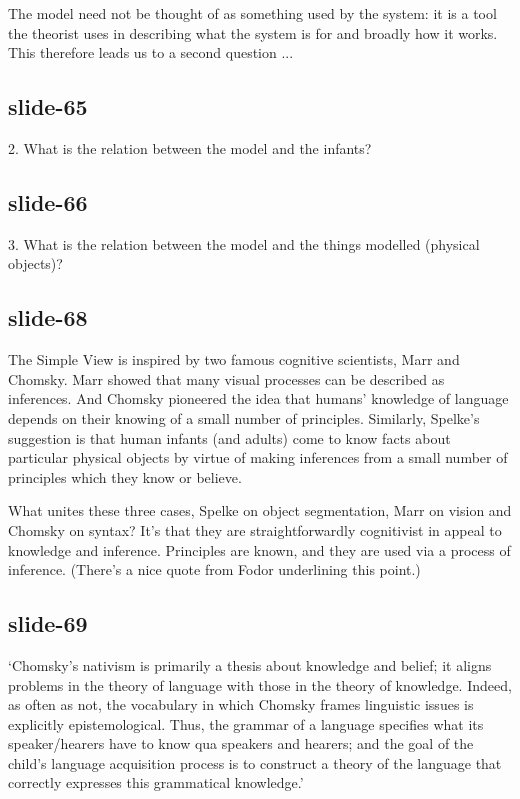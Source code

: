 \documentclass[12pt,\papersize]{extarticle}
\begin{document}
The model need not be thought of as something used by the system: it is
a tool the theorist uses in describing what the system is for and
broadly how it works.
This therefore leads us to a second question ...
 
\subsection{slide-65}
2. What is the relation between the model and the infants?
 
\subsection{slide-66}
3. What is the relation between the model and the things modelled (physical objects)?
 
\subsection{slide-68}
The Simple View is inspired by two famous cognitive scientists, Marr and Chomsky.
Marr showed that many visual processes can be described as inferences.
And Chomsky pioneered the idea that humans’ knowledge of language depends on their knowing of a small number of 
principles.
Similarly, Spelke’s suggestion is that human infants (and adults) come to
know facts about particular physical objects by virtue of making inferences
from a small number of principles which they know or believe.
 
What unites these three cases, Spelke on object segmentation, Marr on vision and Chomsky on 
syntax?
It’s that they are straightforwardly cognitivist in appeal to knowledge and inference.
Principles are known, and they are used via a process of inference.
(There’s a nice quote from Fodor underlining this point.)
 
\subsection{slide-69}
‘Chomsky’s nativism is primarily a thesis about knowledge and belief; it aligns problems 
in the theory of language with those in the theory of knowledge.  Indeed, as often as not, 
the vocabulary in which Chomsky frames linguistic issues is explicitly epistemological.  
Thus, the grammar of a language specifies what its speaker/hearers have to know qua speakers 
and hearers; and the goal of the child’s language acquisition process is to construct a 
theory of the language that correctly expresses this grammatical knowledge.’
\citep[p.\ 11]{Fodor:2000cj}
 
\end{document}
